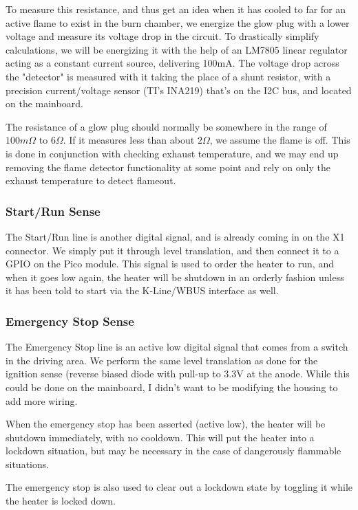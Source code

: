 \documentclass[lettersize,journal]{IEEEtran}
\begin{document}
To measure this resistance, and thus get an idea when it has cooled to far for an active flame to exist in the burn chamber, we energize the glow plug with a lower voltage and measure its voltage drop in the circuit.  To drastically simplify calculations, we will be energizing it with the help of an LM7805 linear regulator acting as a constant current source, delivering 100mA.  The voltage drop across the "detector" is measured with it taking the place of a shunt resistor, with a precision current/voltage sensor (TI's INA219) that's on the I2C bus, and located on the mainboard.

The resistance of a glow plug should normally be somewhere in the range of $100 m \Omega$ to $6 \Omega$.  If it measures less than about $2 \Omega$, we assume the flame is off.  This is done in conjunction with checking exhaust temperature, and we may end up removing the flame detector functionality at some point and rely on only the exhaust temperature to detect flameout.

\subsubsection{Start/Run Sense}
The Start/Run line is another digital signal, and is already coming in on the X1 connector.  We simply put it through level translation, and then connect it to a GPIO on the Pico module.  This signal is used to order the heater to run, and when it goes low again, the heater will be shutdown in an orderly fashion unless it has been told to start via the K-Line/WBUS interface as well.

\subsubsection{Emergency Stop Sense}
The Emergency Stop line is an active low digital signal that comes from a switch in the driving area.  We perform the same level translation as done for the ignition sense (reverse biased diode with pull-up to 3.3V at the anode.  While this could be done on the mainboard, I didn't want to be modifying the housing to add more wiring.

When the emergency stop has been asserted (active low), the heater will be shutdown immediately, with no cooldown.  This will put the heater into a lockdown situation, but may be necessary in the case of dangerously flammable situations.

The emergency stop is also used to clear out a lockdown state by toggling it while the heater is locked down.
\end{document}

